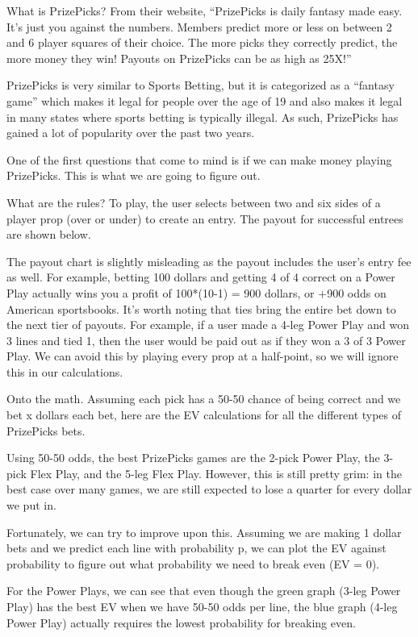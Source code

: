 What is PrizePicks? From their website, “PrizePicks is daily fantasy made easy. It’s just you against the numbers. Members predict more or less on between 2 and 6 player squares of their choice. The more picks they correctly predict, the more money they win! Payouts on PrizePicks can be as high as 25X!”

PrizePicks is very similar to Sports Betting, but it is categorized as a “fantasy game” which makes it legal for people over the age of 19 and also makes it legal in many states where sports betting is typically illegal. As such, PrizePicks has gained a lot of popularity over the past two years.

One of the first questions that come to mind is if we can make money playing PrizePicks. This is what we are going to figure out.

What are the rules? To play, the user selects between two and six sides of a player prop (over or under) to create an entry. The payout for successful entrees are shown below.


The payout chart is slightly misleading as the payout includes the user's entry fee as well. For example, betting 100 dollars and getting 4 of 4 correct on a Power Play actually wins you a profit of 100*(10-1) = 900 dollars, or +900 odds on American sportsbooks.
It’s worth noting that ties bring the entire bet down to the next tier of payouts. For example, if a user made a 4-leg Power Play and won 3 lines and tied 1, then the user would be paid out as if they won a 3 of 3 Power Play. We can avoid this by playing every prop at a half-point, so we will ignore this in our calculations. 

Onto the math. Assuming each pick has a 50-50 chance of being correct and we bet x dollars each bet, here are the EV calculations for all the different types of PrizePicks bets.


Using 50-50 odds, the best PrizePicks games are the 2-pick Power Play, the 3-pick Flex Play, and the 5-leg Flex Play. However, this is still pretty grim: in the best case over many games, we are still expected to lose a quarter for every dollar we put in. 

Fortunately, we can try to improve upon this. Assuming we are making 1 dollar bets and we predict each line with probability p, we can plot the EV against probability to figure out what probability we need to break even (EV = 0). 

For the Power Plays, we can see that even though the green graph (3-leg Power Play) has the best EV when we have 50-50 odds per line, the blue graph (4-leg Power Play) actually requires the lowest probability for breaking even.  

